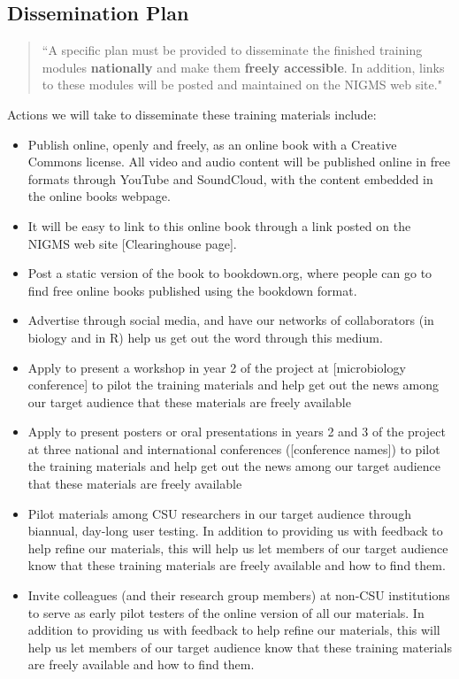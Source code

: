 \documentclass[pdftex,english,11pt,parskip=half]{scrartcl}
\begin{document}
\subsection{Dissemination Plan}

\begin{quotation}
``A specific plan must be provided to disseminate the finished training modules \textbf{nationally} and make them \textbf{freely accessible}. In addition, links to these modules will be posted and maintained on the NIGMS web site."
\end{quotation}

Actions we will take to disseminate these training materials include: 

\begin{itemize}
\item Publish online, openly and freely, as an online book with a Creative Commons license. All video and audio content will be published online in free formats through YouTube and SoundCloud, with the content embedded in the online books webpage. 
\item It will be easy to link to this online book through a link posted on the NIGMS web site [Clearinghouse page].
\item Post a static version of the book to bookdown.org, where people can go to find free online books published using the bookdown format. 
\item Advertise through social media, and have our networks of collaborators (in biology and in R) help us get out the word through this medium.
\item Apply to present a workshop in year 2 of the project at [microbiology conference] to pilot the training materials and help get out the news among our target audience that these materials are freely available 
\item Apply to present posters or oral presentations in years 2 and 3 of the project at three national and international conferences ([conference names]) to pilot the training materials and help get out the news among our target audience that these materials are freely available
\item Pilot materials among CSU researchers in our target audience through biannual, day-long user testing. In addition to providing us with feedback to help refine our materials, this will help us let members of our target audience know that these training materials are freely available and how to find them.
\item Invite colleagues (and their research group members) at non-CSU institutions to serve as early pilot testers of the online version of all our materials. In addition to providing us with feedback to help refine our materials, this will help us let members of our target audience know that these training materials are freely available and how to find them.
\end{itemize}
\end{document}
